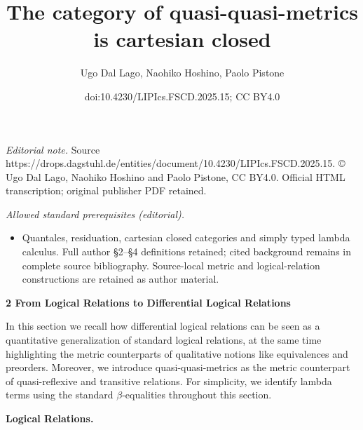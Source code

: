 \documentclass[10pt,a4paper]{amsart}
\title{The category of quasi-quasi-metrics is cartesian closed}
\author{Ugo Dal Lago, Naohiko Hoshino, Paolo Pistone}
\date{doi:10.4230/LIPIcs.FSCD.2025.15; CC BY4.0}
\begin{document}
\maketitle
\noindent\textit{Editorial note.} Source https://drops.dagstuhl.de/entities/document/10.4230/LIPIcs.FSCD.2025.15. © Ugo Dal Lago, Naohiko Hoshino and Paolo Pistone, CC BY4.0. Official HTML transcription; original publisher PDF retained.\par\medskip
\noindent\textit{Allowed standard prerequisites (editorial).}\begin{itemize}
\item Quantales, residuation, cartesian closed categories and simply typed lambda calculus. Full author §2–§4 definitions retained; cited background remains in complete source bibliography. Source-local metric and logical-relation constructions are retained as author material.
\end{itemize}\medskip
 
\par\medskip\noindent\textbf{2 From Logical Relations to Differential Logical Relations}\par
 
 
In this section we recall how differential logical relations can be seen as a quantitative generalization of standard logical relations, at the same time highlighting the metric counterparts of qualitative notions like equivalences and preorders. Moreover, we introduce quasi-quasi-metrics as the metric counterpart of quasi-reflexive and transitive relations. For simplicity, we identify lambda terms using the standard $\beta$-equalities throughout this section.\par
 
 
 
\par\medskip\noindent\textbf{Logical Relations.}\par
 
 
\end{document}
